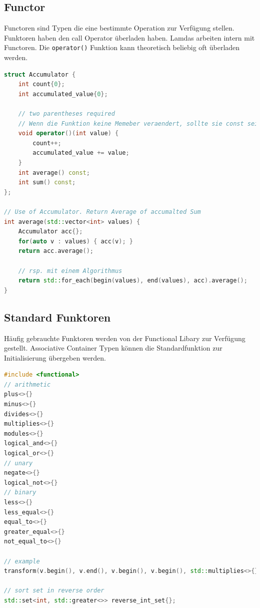 \subsection{Functor}
Functoren sind Typen die eine bestimmte Operation zur Verfügung stellen. Funktoren haben den call Operator überladen haben. Lamdas arbeiten intern mit Functoren. Die \lstinline|operator()| Funktion kann theoretisch beliebig oft überladen werden.
\begin{lstlisting}[language=C++]
struct Accumulator {
	int count{0};
	int accumulated_value{0};
	
	// two parentheses required
	// Wenn die Funktion keine Memeber veraendert, sollte sie const sein!
	void operator()(int value) {
		count++;
		accumulated_value += value;
	}
	int average() const;
	int sum() const;
};

// Use of Accumulator. Return Average of accumalted Sum
int average(std::vector<int> values) {
	Accumulator acc{};
	for(auto v : values) { acc(v); }
	return acc.average(); 
	
	// rsp. mit einem Algorithmus
	return std::for_each(begin(values), end(values), acc).average();
}
\end{lstlisting}


\subsection{Standard Funktoren}
Häufig gebrauchte Funktoren werden von der Functional Libary zur Verfügung gestellt. Associative Container Typen können die Standardfunktion zur Initialisierung übergeben werden.
\begin{lstlisting}[language=C++]
#include <functional>
// arithmetic
plus<>{}
minus<>{}
divides<>{}
multiplies<>{}
modules<>{}
logical_and<>{}
logical_or<>{}
// unary
negate<>{}
logical_not<>{}
// binary
less<>{}
less_equal<>{}
equal_to<>{}
greater_equal<>{}
not_equal_to<>{}

// example
transform(v.begin(), v.end(), v.begin(), v.begin(), std::multiplies<>{})

// sort set in reverse order
std::set<int, std::greater<>> reverse_int_set{};
\end{lstlisting}



